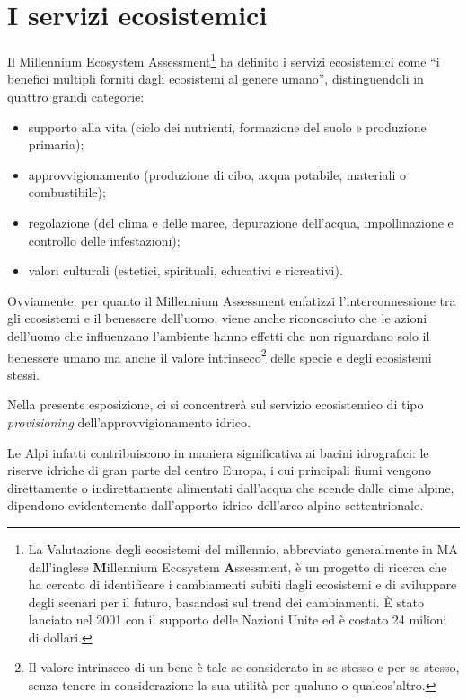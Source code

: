 \documentclass[14pt,a4paper]{article}
\begin{document}
	\section{I servizi ecosistemici}
		Il Millennium Ecosystem Assessment\footnote{La Valutazione degli ecosistemi del millennio, abbreviato generalmente in MA dall'inglese \textbf{M}illennium Ecosystem \textbf{A}ssessment, è un progetto di ricerca che ha cercato di identificare i cambiamenti subiti dagli ecosistemi e di sviluppare degli scenari per il futuro, basandosi sul trend dei cambiamenti. È stato lanciato nel 2001 con il supporto delle Nazioni Unite ed è costato 24 milioni di dollari.} \cite{MEA_EcosystemsAndHumanWellBeing:Synthesis} ha definito i servizi ecosistemici come ``i benefici multipli forniti dagli ecosistemi al genere umano'', distinguendoli in quattro grandi categorie:
		\begin{itemize}
			\item supporto alla vita (ciclo dei nutrienti, formazione del suolo e produzione primaria);
			\item approvvigionamento (produzione di cibo, acqua potabile, materiali o combustibile);
			\item regolazione (del clima e delle maree, depurazione dell'acqua, impollinazione e controllo delle infestazioni);
			\item valori culturali (estetici, spirituali, educativi e ricreativi).
		\end{itemize}
		
		
		Ovviamente, per quanto il Millennium Assessment enfatizzi l'interconnessione tra gli ecosistemi e il benessere dell'uomo, viene anche riconosciuto che le azioni dell'uomo che influenzano l'ambiente hanno effetti che non riguardano solo il benessere umano ma anche il valore intrinseco\footnote{ Il valore intrinseco di un bene è tale se considerato in se stesso e per se stesso, senza tenere in considerazione la sua utilità per qualuno o qualcos'altro.} delle specie e degli ecosistemi stessi.
		
		Nella presente esposizione, ci si concentrerà sul servizio ecosistemico di tipo \textit{provisioning} dell'approvvigionamento idrico. 
		
		Le Alpi infatti contribuiscono in maniera significativa ai bacini idrografici: le riserve idriche di gran parte del centro Europa, i cui principali fiumi vengono direttamente o indirettamente alimentati dall'acqua che scende dalle cime alpine, dipendono evidentemente dall'apporto idrico dell'arco alpino settentrionale. 
	
\end{document}
